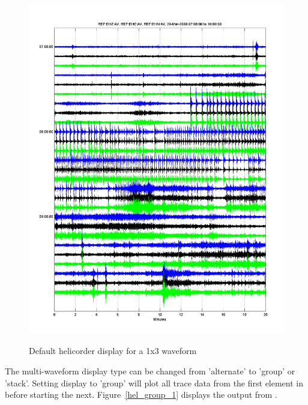 \documentclass[11pt]{article}
\begin{document}
\begin{figure}[ht] 
\centerline{\scalebox{.6} {\includegraphics{hel_alternate_1.png}}} 
\caption{Default helicorder display for a 1x3 waveform} 
\label{hel_alternate_1}
\end{figure}
\clearpage

The multi-waveform display type can be changed from 'alternate' to 'group' or 'stack'. Setting display to 'group' will plot all trace data from the first element in  before starting the next. Figure~\ref{hel_group_1} displays the output from .
\end{document}
